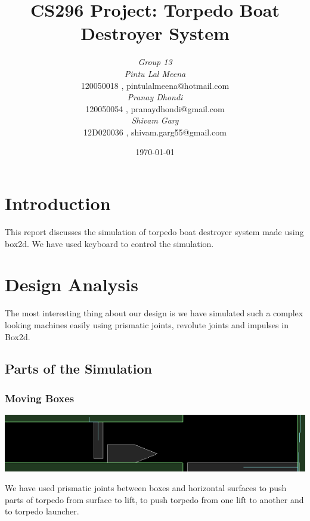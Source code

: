 \documentclass[11pt]{article}
\begin{document}
\nocite{*}


\title {CS296 Project: Torpedo Boat Destroyer System}
\author {\emph{Group 13} \\ %
	\emph{Pintu Lal Meena} \\
	 \textrm{120050018} ,  \textsf{pintulalmeena@hotmail.com} \\
	\emph{Pranay Dhondi } \\
	\textrm{120050054} , \textsf{pranaydhondi@gmail.com} \\
	\emph{Shivam Garg}\\
	\textrm{12D020036} , \textsf{shivam.garg55@gmail.com}}
\date{\today}   %
\maketitle
\section{Introduction}
This report discusses the simulation of torpedo boat destroyer system made using box2d.  We have used keyboard to control the simulation. 
\section{Design Analysis}
The most interesting thing about our design is we have simulated such a complex looking 
machines easily using prismatic joints, revolute joints and impulses in Box2d.
\subsection{Parts of the Simulation}
\subsubsection{Moving Boxes}
 \begin{center}
 \includegraphics[scale=0.5]{./images/push}
 \end{center}
We have used prismatic joints between boxes and horizontal surfaces to push parts of torpedo from surface to lift, to push torpedo from one lift to
another and to torpedo launcher.
\end{document}
